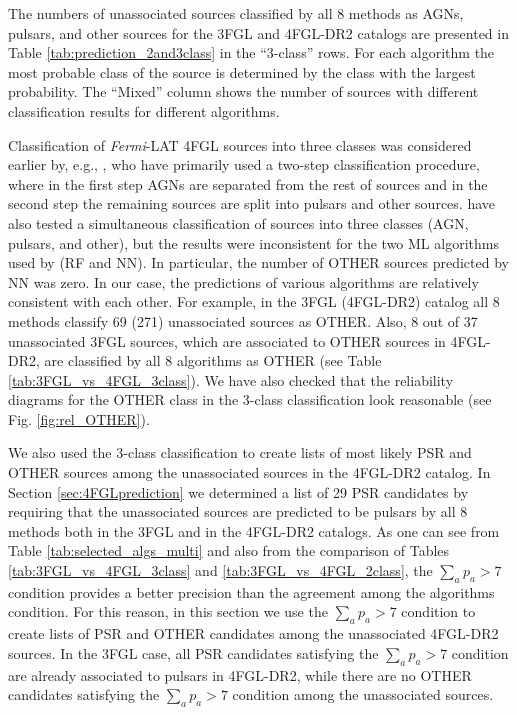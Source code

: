 \documentclass{aa}
\newcommand{\Fermi}{\textit{Fermi}\xspace}
\begin{document}
The numbers of unassociated sources classified by all 8 methods as AGNs, pulsars, and other sources for the 3FGL and 4FGL-DR2 catalogs are presented in Table \ref{tab:prediction_2and3class} in the ``3-class'' rows.
For each algorithm the most probable class of the source is determined by the class with the largest probability.
The ``Mixed'' column shows the number of sources with different classification results for different algorithms.

Classification of \Fermi-LAT 4FGL sources into three classes was considered earlier by, e.g., \cite{2021RAA....21...15Z}, 
who have primarily used a two-step classification procedure, where in the first step AGNs are separated from the rest of sources and in the second step the remaining sources are split into pulsars and other sources.
\cite{2021RAA....21...15Z} have also tested a simultaneous classification of sources into three classes (AGN, pulsars, and other),
but the results were inconsistent for the two ML algorithms used by \cite{2021RAA....21...15Z} (RF and NN).
In particular, the number of OTHER sources predicted by NN was zero.
In our case, the predictions of various algorithms are relatively consistent with each other.
For example, in the 3FGL (4FGL-DR2) catalog all 8 methods classify 69 (271) unassociated sources as OTHER.
Also, 8 out of 37 unassociated 3FGL sources, which are associated to OTHER sources in 4FGL-DR2, are classified by all 8 algorithms as
OTHER (see Table \ref{tab:3FGL_vs_4FGL_3class}).
We have also checked that the reliability diagrams for the OTHER class in the 3-class classification look reasonable
(see Fig. \ref{fig:rel_OTHER}).

We also used the 3-class classification to create lists of most likely PSR and OTHER sources among the unassociated
sources in the 4FGL-DR2 catalog.
In Section \ref{sec:4FGLprediction} we determined a list of 29 PSR candidates by requiring that 
the unassociated sources are predicted to be pulsars by all 8 methods both in the 3FGL and in the 4FGL-DR2 catalogs.
As one can see from Table \ref{tab:selected_algs_multi} and also from the comparison of Tables \ref{tab:3FGL_vs_4FGL_3class}
and \ref{tab:3FGL_vs_4FGL_2class}, the $\sum_a p_a > 7$ condition provides a better precision than the 
agreement among the algorithms condition.
For this reason, in this section we use the $\sum_a p_a > 7$ condition to create lists of PSR and OTHER candidates
among the unassociated 4FGL-DR2 sources.
In the 3FGL case, all PSR candidates satisfying the $\sum_a p_a > 7$ condition are already associated to pulsars in 4FGL-DR2,
while there are no OTHER candidates satisfying the $\sum_a p_a > 7$ condition among the unassociated sources. 
\end{document}
